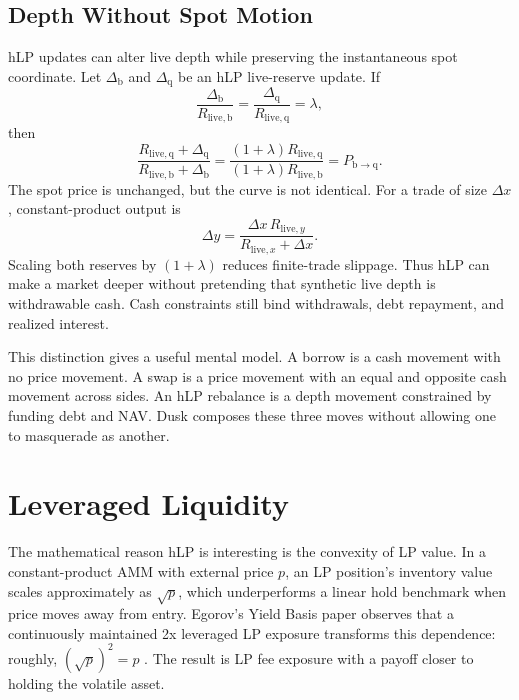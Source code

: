 \documentclass[11pt]{article}
\newcommand{\base}{\mathrm{b}}
\newcommand{\qasset}{\mathrm{q}}
\newcommand{\live}{\mathrm{live}}
\begin{document}
\subsection{Depth Without Spot Motion}

hLP updates can alter live depth while preserving the instantaneous spot coordinate. Let $\Delta_{\base}$ and $\Delta_{\qasset}$ be an hLP live-reserve update. If
\begin{equation}
\frac{\Delta_{\base}}{R_{\live,\base}}=\frac{\Delta_{\qasset}}{R_{\live,\qasset}}=\lambda,
\end{equation}
then
\begin{equation}
\frac{R_{\live,\qasset}+\Delta_{\qasset}}{R_{\live,\base}+\Delta_{\base}}
=
\frac{(1+\lambda)R_{\live,\qasset}}{(1+\lambda)R_{\live,\base}}
=P_{\base\to\qasset}.
\end{equation}
The spot price is unchanged, but the curve is not identical. For a trade of size $\Delta x$, constant-product output is
\begin{equation}
\Delta y=\frac{\Delta x\,R_{\live,y}}{R_{\live,x}+\Delta x}.
\end{equation}
Scaling both reserves by $(1+\lambda)$ reduces finite-trade slippage. Thus hLP can make a market deeper without pretending that synthetic live depth is withdrawable cash. Cash constraints still bind withdrawals, debt repayment, and realized interest.

This distinction gives a useful mental model. A borrow is a cash movement with no price movement. A swap is a price movement with an equal and opposite cash movement across sides. An hLP rebalance is a depth movement constrained by funding debt and NAV. Dusk composes these three moves without allowing one to masquerade as another.

\section{Leveraged Liquidity}

The mathematical reason hLP is interesting is the convexity of LP value. In a constant-product AMM with external price $p$, an LP position's inventory value scales approximately as $\sqrt{p}$, which underperforms a linear hold benchmark when price moves away from entry. Egorov's Yield Basis paper observes that a continuously maintained 2x leveraged LP exposure transforms this dependence: roughly, $(\sqrt{p})^2=p$ \cite{egorov-yieldbasis-whitepaper,yieldbasis-how}. The result is LP fee exposure with a payoff closer to holding the volatile asset.
\end{document}
